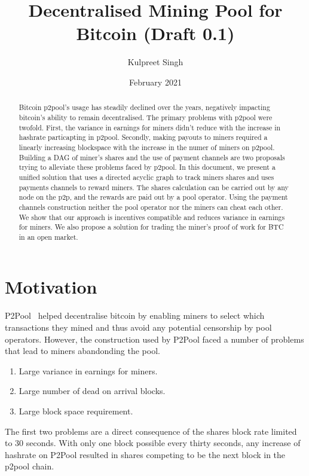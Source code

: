 \documentclass{article}
\title{Decentralised Mining Pool for Bitcoin (Draft 0.1)}
\author{Kulpreet Singh}
\date{February 2021}
\begin{document}
\maketitle

\begin{abstract}
  Bitcoin p2pool's usage has steadily declined over the years,
  negatively impacting bitcoin's ability to remain decentralised. The
  primary problems with p2pool were twofold. First, the variance in
  earnings for miners didn't reduce with the increase in hashrate
  particapting in p2pool. Secondly, making payouts to miners required
  a linearly increasing blockspace with the increase in the numer of
  miners on p2pool. Building a DAG of miner's shares and the use of
  payment channels are two proposals trying to alleviate these
  problems faced by p2pool. In this document, we present a unified
  solution that uses a directed acyclic graph to track miners shares
  and uses payments channels to reward miners. The shares calculation
  can be carried out by any node on the p2p, and the rewards are paid
  out by a pool operator. Using the payment channels construction
  neither the pool operator nor the miners can cheat each other. We
  show that our approach is incentives compatible and reduces variance
  in earnings for miners. We also propose a solution for trading the
  miner's proof of work for BTC in an open market.
\end{abstract}
   
\section{Motivation}

P2Pool~\cite{p2pool:wiki} helped decentralise bitcoin by enabling
miners to select which transactions they mined and thus avoid any
potential censorship by pool operators. However, the construction used
by P2Pool faced a number of problems that lead to miners abandonding
the pool.

\begin{enumerate}
  \item Large variance in earnings for miners.
  \item Large number of dead on arrival blocks.
  \item Large block space requirement.
\end{enumerate}

The first two problems are a direct consequence of the shares block
rate limited to 30 seconds. With only one block possible every thirty
seconds, any increase of hashrate on P2Pool resulted in shares
competing to be the next block in the p2pool chain.
\end{document}
